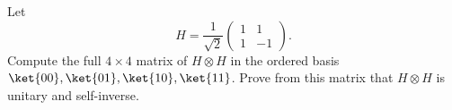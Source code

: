 Let
$$
    H=\frac1{\sqrt2}\begin{pmatrix}1&1\\1&-1\end{pmatrix}.
$$
Compute the full $4\times4$ matrix of $H\otimes H$ in the ordered basis $\ket{00},\ket{01},\ket{10},\ket{11}$.  Prove from this matrix that $H\otimes H$ is unitary and self-inverse.
